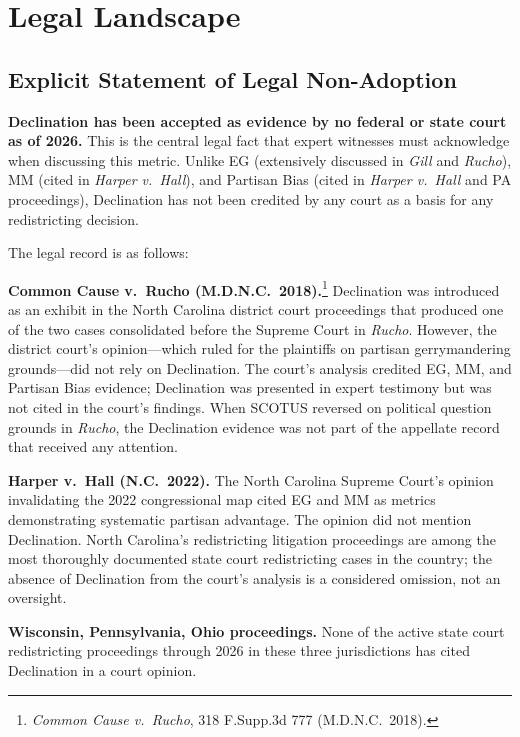 \section{Legal Landscape}
\label{sec:legal}

\subsection{Explicit Statement of Legal Non-Adoption}

\textbf{Declination has been accepted as evidence by no federal or state court as
of 2026.} This is the central legal fact that expert witnesses must acknowledge
when discussing this metric. Unlike EG (extensively discussed in \textit{Gill}
and \textit{Rucho}), MM (cited in \textit{Harper v.\ Hall}), and Partisan Bias
(cited in \textit{Harper v.\ Hall} and PA proceedings), Declination has not
been credited by any court as a basis for any redistricting decision.

The legal record is as follows:

\textbf{Common Cause v.\ Rucho (M.D.N.C.\ 2018).}\footnote{\textit{Common Cause
v.\ Rucho}, 318 F.Supp.3d 777 (M.D.N.C.\ 2018).} Declination was introduced as
an exhibit in the North Carolina district court proceedings that produced one of
the two cases consolidated before the Supreme Court in \textit{Rucho}. However,
the district court's opinion---which ruled for the plaintiffs on partisan
gerrymandering grounds---did not rely on Declination. The court's analysis
credited EG, MM, and Partisan Bias evidence; Declination was presented in expert
testimony but was not cited in the court's findings. When SCOTUS reversed on
political question grounds in \textit{Rucho}, the Declination evidence was
not part of the appellate record that received any attention.

\textbf{Harper v.\ Hall (N.C.\ 2022).} The North Carolina Supreme Court's opinion
invalidating the 2022 congressional map cited EG and MM as metrics demonstrating
systematic partisan advantage. The opinion did not mention Declination. North
Carolina's redistricting litigation proceedings are among the most thoroughly
documented state court redistricting cases in the country; the absence of
Declination from the court's analysis is a considered omission, not an oversight.

\textbf{Wisconsin, Pennsylvania, Ohio proceedings.} None of the active state court
redistricting proceedings through 2026 in these three jurisdictions has cited
Declination in a court opinion.


